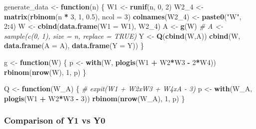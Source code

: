 \documentclass[
]{article}
\newenvironment{Shaded}{\begin{snugshade}}{\end{snugshade}}
\newcommand{\AttributeTok}[1]{\textcolor[rgb]{0.13,0.29,0.53}{#1}}
\newcommand{\CommentTok}[1]{\textcolor[rgb]{0.56,0.35,0.01}{\textit{#1}}}
\newcommand{\ControlFlowTok}[1]{\textcolor[rgb]{0.13,0.29,0.53}{\textbf{#1}}}
\newcommand{\DecValTok}[1]{\textcolor[rgb]{0.00,0.00,0.81}{#1}}
\newcommand{\FloatTok}[1]{\textcolor[rgb]{0.00,0.00,0.81}{#1}}
\newcommand{\FunctionTok}[1]{\textcolor[rgb]{0.13,0.29,0.53}{\textbf{#1}}}
\newcommand{\NormalTok}[1]{#1}
\newcommand{\OtherTok}[1]{\textcolor[rgb]{0.56,0.35,0.01}{#1}}
\newcommand{\SpecialCharTok}[1]{\textcolor[rgb]{0.81,0.36,0.00}{\textbf{#1}}}
\newcommand{\StringTok}[1]{\textcolor[rgb]{0.31,0.60,0.02}{#1}}
\begin{document}
\begin{Shaded}
\begin{Highlighting}[]
\NormalTok{generate\_data }\OtherTok{\textless{}{-}} \ControlFlowTok{function}\NormalTok{(n) \{}
\NormalTok{  W1 }\OtherTok{\textless{}{-}} \FunctionTok{runif}\NormalTok{(n, }\DecValTok{0}\NormalTok{, }\DecValTok{2}\NormalTok{)}
\NormalTok{  W2\_4 }\OtherTok{\textless{}{-}} \FunctionTok{matrix}\NormalTok{(}\FunctionTok{rbinom}\NormalTok{(n }\SpecialCharTok{*} \DecValTok{3}\NormalTok{, }\DecValTok{1}\NormalTok{, }\FloatTok{0.5}\NormalTok{), }\AttributeTok{ncol =} \DecValTok{3}\NormalTok{)}
  \FunctionTok{colnames}\NormalTok{(W2\_4) }\OtherTok{\textless{}{-}} \FunctionTok{paste0}\NormalTok{(}\StringTok{"W"}\NormalTok{, }\DecValTok{2}\SpecialCharTok{:}\DecValTok{4}\NormalTok{)}
\NormalTok{  W }\OtherTok{\textless{}{-}} \FunctionTok{cbind}\NormalTok{(}\FunctionTok{data.frame}\NormalTok{(}\AttributeTok{W1 =}\NormalTok{ W1), W2\_4)}
\NormalTok{  A }\OtherTok{\textless{}{-}} \FunctionTok{g}\NormalTok{(W)}
  \CommentTok{\# A \textless{}{-} sample(c(0, 1), size = n, replace = TRUE)}
\NormalTok{  Y }\OtherTok{\textless{}{-}} \FunctionTok{Q}\NormalTok{(}\FunctionTok{cbind}\NormalTok{(W,A))}
  \FunctionTok{cbind}\NormalTok{(W, }\FunctionTok{data.frame}\NormalTok{(}\AttributeTok{A =}\NormalTok{ A), }\FunctionTok{data.frame}\NormalTok{(}\AttributeTok{Y =}\NormalTok{ Y))}
\NormalTok{\}}

\NormalTok{g }\OtherTok{\textless{}{-}} \ControlFlowTok{function}\NormalTok{(W) \{}
\NormalTok{  p }\OtherTok{\textless{}{-}} \FunctionTok{with}\NormalTok{(W, }\FunctionTok{plogis}\NormalTok{(W1 }\SpecialCharTok{+}\NormalTok{ W2}\SpecialCharTok{*}\NormalTok{W3 }\SpecialCharTok{{-}} \DecValTok{2}\SpecialCharTok{*}\NormalTok{W4))}
  \FunctionTok{rbinom}\NormalTok{(}\FunctionTok{nrow}\NormalTok{(W), }\DecValTok{1}\NormalTok{, p)}
\NormalTok{\}}

\NormalTok{Q }\OtherTok{\textless{}{-}} \ControlFlowTok{function}\NormalTok{(W\_A) \{}
  \CommentTok{\# expit(W1 + W2xW3 + W4xA {-} 3)}
\NormalTok{  p }\OtherTok{\textless{}{-}} \FunctionTok{with}\NormalTok{(W\_A, }\FunctionTok{plogis}\NormalTok{(W1 }\SpecialCharTok{+}\NormalTok{ W2}\SpecialCharTok{*}\NormalTok{W3 }\SpecialCharTok{{-}} \DecValTok{3}\NormalTok{))}
  \FunctionTok{rbinom}\NormalTok{(}\FunctionTok{nrow}\NormalTok{(W\_A), }\DecValTok{1}\NormalTok{, p)}
\NormalTok{\}}
\end{Highlighting}
\end{Shaded}

\subsubsection{Comparison of Y1 vs Y0}\label{comparison-of-y1-vs-y0}
\end{document}
